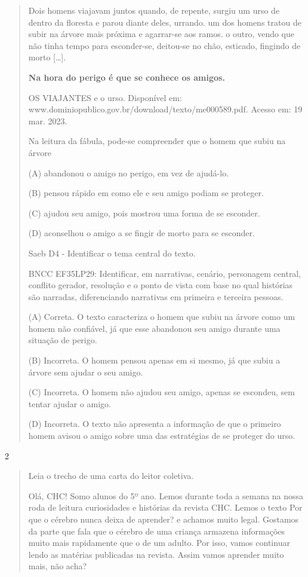\begin{itemize}
{{{\begin{itemize}
\begin{itemize}
\begin{itemize}
\begin{quote}
Dois homens viajavam juntos quando, de repente, surgiu um urso de dentro
da floresta e parou diante deles, urrando. um dos homens tratou de subir
na árvore mais próxima e agarrar-se aos ramos. o outro, vendo que não
tinha tempo para esconder-se, deitou-se no chão, esticado, fingindo de
morto {[}\ldots{}{]}.

\textbf{Na hora do perigo é que se conhece os amigos.}

OS VIAJANTES e o urso. Disponível em:
www.dominiopublico.gov.br/download/texto/me000589.pdf. Acesso em: 19
mar. 2023.

Na leitura da fábula, pode-se compreender que o homem que subiu na
árvore

(A) abandonou o amigo no perigo, em vez de ajudá-lo.

(B) pensou rápido em como ele e seu amigo podiam se proteger.

(C) ajudou seu amigo, pois mostrou uma forma de se esconder.

(D) aconselhou o amigo a se fingir de morto para se esconder.

Saeb D4 - Identificar o tema central do texto.

BNCC EF35LP29: Identificar, em narrativas, cenário, personagem central,
conflito gerador, resolução e o ponto de vista com base no qual
histórias são narradas, diferenciando narrativas em primeira e terceira
pessoas.

(A) Correta. O texto caracteriza o homem que subiu na árvore como um
homem não confiável, já que esse abandonou seu amigo durante uma
situação de perigo.

(B) Incorreta. O homem pensou apenas em si mesmo, já que subiu a árvore
sem ajudar o seu amigo.

(C) Incorreta. O homem não ajudou seu amigo, apenas se escondeu, sem
tentar ajudar o amigo.

(D) Incorreta. O texto não apresenta a informação de que o primeiro
homem avisou o amigo sobre uma das estratégias de se proteger do urso.
\end{quote}

\num{2}

\begin{quote}
Leia o trecho de uma carta do leitor coletiva.

Olá, CHC! Somo alunos do 5º ano. Lemos durante toda a semana na nossa
roda de leitura curiosidades e histórias da revista CHC. Lemos o texto
Por que o cérebro nunca deixa de aprender? e achamos muito legal.
Gostamos da parte que fala que o cérebro de uma criança armazena
informações muito mais rapidamente que o de um adulto. Por isso, vamos
continuar lendo as matérias publicadas na revista. Assim vamos aprender
muito mais, não acha?


\end{quote}
\end{itemize}
\end{itemize}
\end{itemize}}}}
\end{itemize}
